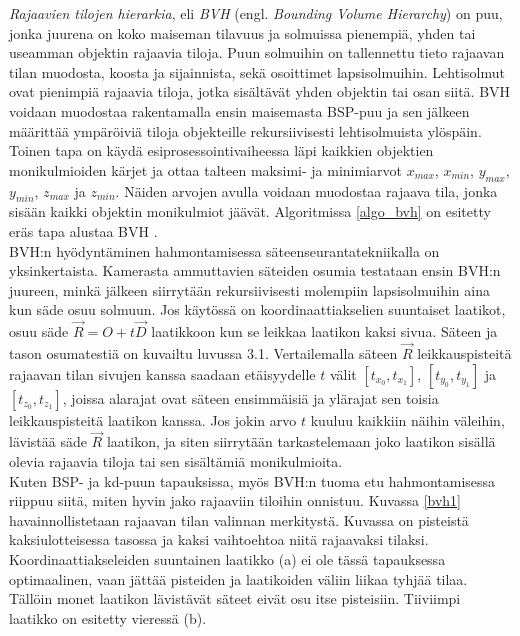 ﻿\documentclass[a4paper, 12pt, titlepage]{article}
\begin{document}
\emph{Rajaavien tilojen hierarkia}, eli \emph{BVH} (engl. \emph{Bounding Volume Hierarchy}) on puu, jonka juurena on koko maiseman tilavuus ja solmuissa pienempiä, yhden tai useamman objektin rajaavia tiloja. Puun solmuihin on tallennettu tieto rajaavan tilan muodosta, koosta ja sijainnista, sekä osoittimet lapsisolmuihin. Lehtisolmut ovat pienimpiä rajaavia tiloja, jotka sisältävät yhden objektin tai osan siitä. BVH voidaan muodostaa rakentamalla ensin maisemasta BSP-puu ja sen jälkeen määrittää ympäröiviä tiloja objekteille rekursiivisesti lehtisolmuista ylöspäin. \citep{hughes} Toinen tapa on käydä esiprosessointivaiheessa läpi kaikkien objektien monikulmioiden kärjet ja ottaa talteen maksimi- ja minimiarvot $x_{max}$, $x_{min}$, $y_{max}$, $y_{min}$, $z_{max}$ ja $z_{min}$. Näiden arvojen avulla voidaan muodostaa rajaava tila, jonka sisään kaikki objektin monikulmiot jäävät. \citep[.]{janke} Algoritmissa \ref{algo_bvh} on esitetty eräs tapa alustaa BVH \citep{thrane}.\\



BVH:n hyödyntäminen hahmontamisessa säteenseurantatekniikalla on yksinkertaista. Kamerasta ammuttavien säteiden osumia testataan ensin BVH:n juureen, minkä jälkeen siirrytään rekursiivisesti molempiin lapsisolmuihin aina kun säde osuu solmuun. Jos käytössä on koordinaattiakselien suuntaiset laatikot, osuu säde $\vec{R}=O+t\vec{D}$ laatikkoon kun se leikkaa laatikon kaksi sivua. Säteen ja tason osumatestiä on kuvailtu luvussa 3.1. Vertailemalla säteen $\vec{R}$ leikkauspisteitä rajaavan tilan sivujen kanssa saadaan etäisyydelle $t$ välit $[t_{x_0}, t_{x_1}]$, $[t_{y_0}, t_{y_1}]$ ja $[t_{z_0}, t_{z_1}]$, joissa alarajat ovat säteen ensimmäisiä ja ylärajat sen toisia leikkauspisteitä laatikon kanssa. Jos jokin arvo $t$ kuuluu kaikkiin näihin väleihin, lävistää säde $\vec{R}$ laatikon, ja siten siirrytään tarkastelemaan joko laatikon sisällä olevia rajaavia tiloja tai sen sisältämiä monikulmioita. \citep[.]{janke}\\

Kuten BSP- ja kd-puun tapauksissa, myös BVH:n tuoma etu hahmontamisessa riippuu siitä, miten hyvin jako rajaaviin tiloihin onnistuu. Kuvassa \ref{bvh1} havainnollistetaan rajaavan tilan valinnan merkitystä. Kuvassa on pisteistä kaksiulotteisessa tasossa ja kaksi vaihtoehtoa niitä rajaavaksi tilaksi. Koordinaattiakseleiden suuntainen laatikko (a) ei ole tässä tapauksessa optimaalinen, vaan jättää pisteiden ja laatikoiden väliin liikaa tyhjää tilaa. Tällöin monet laatikon lävistävät säteet eivät osu itse pisteisiin. Tiiviimpi laatikko on esitetty vieressä (b).\\
\end{document}
